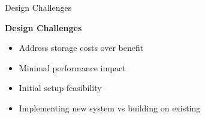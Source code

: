 \begin{frame}[t]{Design Challenges}

  \hspace*{.6in}
  \begin{minipage}{3.5in}
  \begin{center}
	\vspace*{.3in}
	\textbf{Design Challenges}\\
	\begin{itemize}
	\renewcommand{\labelitemi}{$\bullet$}
		\item Address storage costs over benefit
		\item Minimal performance impact
		\item Initial setup feasibility
		\item Implementing new system vs building on existing
	\end{itemize}
  
  \end{center}
  \end{minipage}

\end{frame}